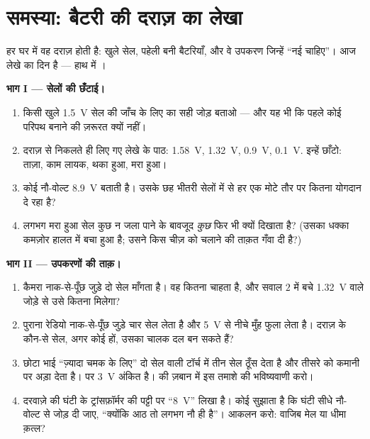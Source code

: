 \section{समस्या: बैटरी की दराज़ का लेखा}

\begin{problem}\label{pb:g8:voltage-voltmeter:1}
हर घर में वह दराज़ होती है: खुले सेल, पहेली बनी बैटरियाँ, और वे उपकरण
जिन्हें ``नई चाहिए''। आज लेखे का दिन है --- हाथ में ।

\medskip\noindent\textbf{भाग I --- सेलों की छँटाई।}
\begin{enumerate}
  \item किसी खुले \qty{1.5}{V} सेल की जाँच के लिए  का सही
        जोड़ बताओ --- और यह भी कि पहले कोई परिपथ बनाने की ज़रूरत
        क्यों नहीं।
  \item दराज़ से निकलते ही लिए गए लेखे के पाठ: \qty{1.58}{V},
        \qty{1.32}{V}, \qty{0.9}{V}, \qty{0.1}{V}. इन्हें छाँटो:
        ताज़ा, काम लायक, थका हुआ, मरा हुआ।
  \item कोई नौ-वोल्ट  \qty{8.9}{V} बताती है। उसके छह भीतरी
        सेलों में से हर एक मोटे तौर पर कितना योगदान दे रहा है?
  \item लगभग मरा हुआ सेल कुछ न जला पाने के बावजूद \emph{कुछ}
         फिर भी क्यों दिखाता है? (उसका धक्का कमज़ोर हालत में
        बचा हुआ है; उसने किस चीज़ को चलाने की ताक़त गँवा दी है?)
\end{enumerate}

\medskip\noindent\textbf{भाग II --- उपकरणों की ताक़।}
\begin{enumerate}[resume]
  \item कैमरा नाक-से-पूँछ जुड़े दो सेल माँगता है। वह कितना 
        चाहता है, और सवाल $2$ में बचे \qty{1.32}{V} वाले जोड़े से
        उसे कितना मिलेगा?
  \item पुराना रेडियो नाक-से-पूँछ जुड़े चार सेल लेता है और
        \qty{5}{V} से नीचे मुँह फुला लेता है। दराज़ के कौन-से सेल,
        अगर कोई हों, उसका चालक दल बन सकते हैं?
  \item छोटा भाई ``ज़्यादा चमक के लिए'' दो सेल वाली टॉर्च में तीन सेल
        ठूँस देता है और तीसरे को कमानी पर अड़ा देता है।  पर
        \qty{3}{V} अंकित है।  की ज़बान में इस तमाशे की
        भविष्यवाणी करो।
  \item दरवाज़े की घंटी के ट्रांसफ़ॉर्मर की पट्टी पर ``\qty{8}{V}''
        लिखा है। कोई सुझाता है कि घंटी सीधे नौ-वोल्ट  से जोड़ दी
        जाए, ``क्योंकि आठ तो लगभग नौ ही है''। आकलन करो: वाजिब मेल या
        धीमा क़त्ल?
\end{enumerate}


\end{problem}
